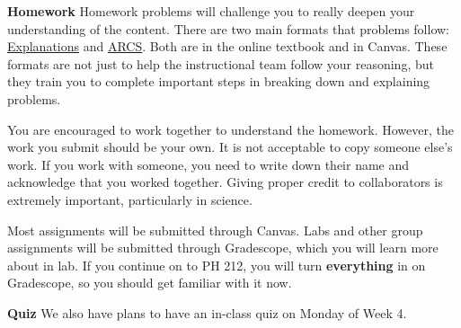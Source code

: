 \documentclass[]{article}
\begin{document}
\begin{TeacherMargin}
\noindent\textbf{Homework} Homework problems will challenge you to really deepen your understanding of the content. There are two main formats that problems follow: \href{https://lipa.physics.oregonstate.edu/sec_what-is-motion.html}{\color{blue}Explanations} and \href{https://lipa.physics.oregonstate.edu/sec_real-world-context.html}{ARCS}. Both are in the online textbook and in Canvas. These formats are not just to help the instructional team follow your reasoning, but they train you to complete important steps in breaking down and explaining problems.

You are encouraged to work together to understand the homework. However, the work you submit should be your own. It is not acceptable to copy someone else's work. If you work with someone, you need to write down their name and acknowledge that you worked together. Giving proper credit to collaborators is extremely important, particularly in science.

Most assignments will be submitted through Canvas. Labs and other group assignments will be submitted through Gradescope, which you will learn more about in lab. If you continue on to PH 212, you will turn \textbf{everything} in on Gradescope, so you should get familiar with it now.

\noindent\textbf{Quiz} We also have plans to have an in-class quiz on Monday of Week 4.
\end{TeacherMargin}
\end{document}

